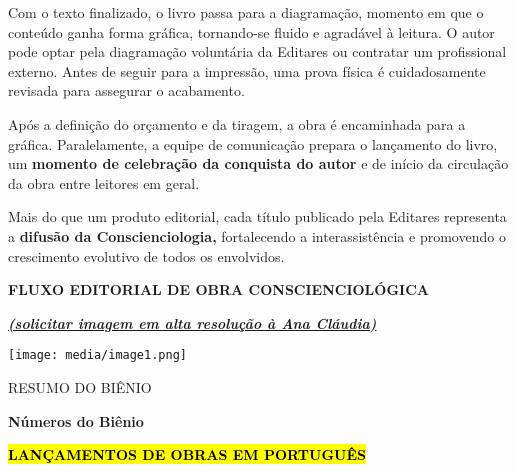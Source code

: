 Com o texto finalizado, o livro passa para a diagramação, momento em que o conteúdo ganha forma gráfica, tornando-se fluido e agradável à leitura. O autor pode optar pela diagramação voluntária da Editares ou contratar um profissional externo. Antes de seguir para a impressão, uma prova física é cuidadosamente revisada para assegurar o acabamento.

Após a definição do orçamento e da tiragem, a obra é encaminhada para a gráfica. Paralelamente, a equipe de comunicação prepara o lançamento do livro, um \textbf{momento de celebração da conquista do autor} e de início da circulação da obra entre leitores em geral.

Mais do que um produto editorial, cada título publicado pela Editares representa a \textbf{difusão da Conscienciologia,} fortalecendo a interassistência e promovendo o crescimento evolutivo de todos os envolvidos.

\textbf{FLUXO EDITORIAL DE OBRA CONSCIENCIOLÓGICA}

\emph{\textbf{\ul{(solicitar imagem em alta resolução à Ana Cláudia)}}}

\texttt{[image: media/image1.png]}

RESUMO DO BIÊNIO

\textbf{Números do Biênio}

\textbf{\hl{LANÇAMENTOS DE OBRAS EM PORTUGUÊS}}

